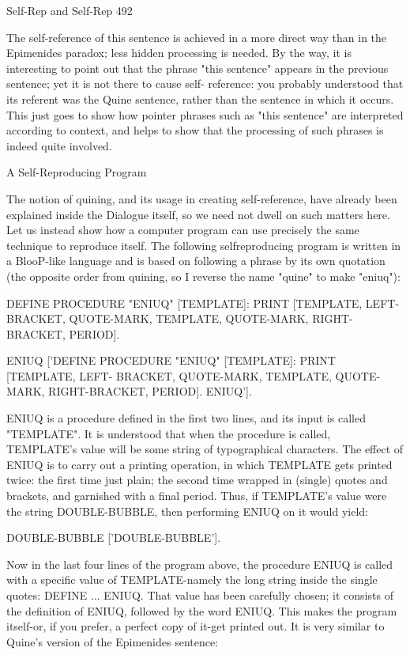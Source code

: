 {Self-Rep and Self-Rep                                                                        492

The self-reference of this sentence is achieved in a more direct way than in the Epimenides
paradox; less hidden processing is needed. By the way, it is interesting to point out that the
phrase "this sentence" appears in the previous sentence; yet it is not there to cause self-
reference: you probably understood that its referent was the Quine sentence, rather than the
sentence in which it occurs. This just goes to show how pointer phrases such as "this
sentence" are interpreted according to context, and helps to show that the processing of such
phrases is indeed quite involved.

                                A Self-Reproducing Program

The notion of quining, and its usage in creating self-reference, have already been explained
inside the Dialogue itself, so we need not dwell on such matters here. Let us instead show
how a computer program can use precisely the same technique to reproduce itself. The
following selfreproducing program is written in a BlooP-like language and is based on
following a phrase by its own quotation (the opposite order from quining, so I reverse the
name "quine" to make "eniuq"):

   DEFINE PROCEDURE "ENIUQ" [TEMPLATE]: PRINT [TEMPLATE, LEFT-
   BRACKET, QUOTE-MARK, TEMPLATE, QUOTE-MARK, RIGHT-BRACKET,
   PERIOD].

   ENIUQ
     ['DEFINE PROCEDURE "ENIUQ" [TEMPLATE]: PRINT [TEMPLATE, LEFT-
     BRACKET, QUOTE-MARK, TEMPLATE, QUOTE-MARK, RIGHT-BRACKET,
     PERIOD]. ENIUQ'].

ENIUQ is a procedure defined in the first two lines, and its input is called "TEMPLATE". It
is understood that when the procedure is called, TEMPLATE's value will be some string of
typographical characters. The effect of ENIUQ is to carry out a printing operation, in which
TEMPLATE gets printed twice: the first time just plain; the second time wrapped in (single)
quotes and brackets, and garnished with a final period. Thus, if TEMPLATE's value were
the string DOUBLE-BUBBLE, then performing ENIUQ on it would yield:

DOUBLE-BUBBLE ['DOUBLE-BUBBLE'].

Now in the last four lines of the program above, the procedure ENIUQ is called with a
specific value of TEMPLATE-namely the long string inside the single quotes: DEFINE ...
ENIUQ. That value has been carefully chosen; it consists of the definition of ENIUQ,
followed by the word ENIUQ. This makes the program itself-or, if you prefer, a perfect copy
of it-get printed out. It is very similar to Quine's version of the Epimenides sentence:

}
